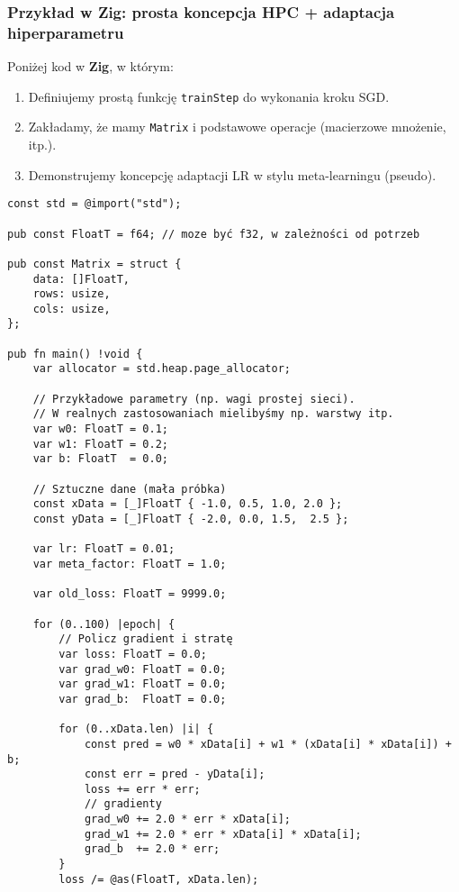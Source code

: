 \documentclass[12pt,a4paper]{article}
\begin{document}
\subsubsection{Przykład w Zig: prosta koncepcja HPC + adaptacja hiperparametru}

Poniżej kod w \textbf{Zig}, w którym:
\begin{enumerate}
    \item Definiujemy prostą funkcję \texttt{trainStep} do wykonania kroku SGD.
    \item Zakładamy, że mamy \texttt{Matrix} i podstawowe operacje (macierzowe mnożenie, itp.).
    \item Demonstrujemy koncepcję adaptacji LR w stylu meta-learningu (pseudo).
\end{enumerate}

\begin{lstlisting}[language=zig, caption=Prosty szkielet HPC w Zig z adaptacją LR]
const std = @import("std");

pub const FloatT = f64; // moze być f32, w zależności od potrzeb

pub const Matrix = struct {
    data: []FloatT,
    rows: usize,
    cols: usize,
};

pub fn main() !void {
    var allocator = std.heap.page_allocator;

    // Przykładowe parametry (np. wagi prostej sieci).
    // W realnych zastosowaniach mielibyśmy np. warstwy itp.
    var w0: FloatT = 0.1;
    var w1: FloatT = 0.2;
    var b: FloatT  = 0.0;

    // Sztuczne dane (mała próbka)
    const xData = [_]FloatT { -1.0, 0.5, 1.0, 2.0 };
    const yData = [_]FloatT { -2.0, 0.0, 1.5,  2.5 };

    var lr: FloatT = 0.01;
    var meta_factor: FloatT = 1.0;

    var old_loss: FloatT = 9999.0;

    for (0..100) |epoch| {
        // Policz gradient i stratę
        var loss: FloatT = 0.0;
        var grad_w0: FloatT = 0.0;
        var grad_w1: FloatT = 0.0;
        var grad_b:  FloatT = 0.0;

        for (0..xData.len) |i| {
            const pred = w0 * xData[i] + w1 * (xData[i] * xData[i]) + b;
            const err = pred - yData[i];
            loss += err * err;
            // gradienty
            grad_w0 += 2.0 * err * xData[i];
            grad_w1 += 2.0 * err * xData[i] * xData[i];
            grad_b  += 2.0 * err;
        }
        loss /= @as(FloatT, xData.len);


\end{lstlisting}
\end{document}
